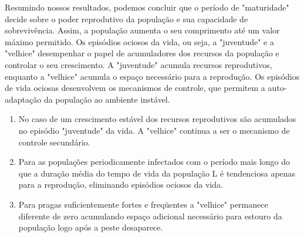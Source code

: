 \documentclass{article}
\begin{document}
Resumindo nossos resultados, podemos concluir que o período de "maturidade" decide sobre o poder reprodutivo da população e sua capacidade de sobrevivência. Assim, a população aumenta o seu comprimento até um valor máximo permitido. Os episódios ociosos da vida, ou seja, a "juventude" e a "velhice" desempenhar o papel de acumuladores dos recursos da população e controlar o seu crescimento. A "juventude" acumula recursos reprodutivos, enquanto a "velhice" acumula o espaço necessário para a reprodução. Os episódios de vida ociosas desenvolvem os mecanismos de controle, que permitem a auto-adaptação da população ao ambiente instável.


\begin{enumerate}

\item No caso de um crescimento estável dos recursos reprodutivos são acumulados no episódio "juventude" da vida. A "velhice" continua a ser o mecanismo de controle secundário.


\item Para as populações periodicamente infectados com o período mais longo do que a duração média do tempo de vida da população L é tendenciosa apenas para a reprodução, eliminando episódios ociosos da vida.


\item Para pragas suficientemente fortes e freqüentes a "velhice" permanece diferente de zero acumulando espaço adicional necessário para estouro da população logo após a peste desaparece.

\end{enumerate}

\end{document}

